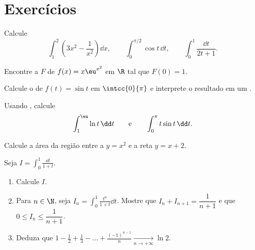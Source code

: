 \section{Exercícios}

\begin{exercise}[$\star$]\label{exo:g12:integ:1}
Calcule
\[
\int_1^2 \left(3x^2 - \frac{1}{x^2}\right)\dd x, \qquad
\int_0^{\pi/2} \cos t \,\dd t, \qquad
\int_0^{1} \frac{\dd t}{2t+1} .
\]
\end{exercise}

\begin{exercise}[$\star$]\label{exo:g12:integ:2}
Encontre a  $F$ de $f(x) = x\eu^{x^2}$ em $\R$ tal que
$F(0) = 1$.
\end{exercise}

\begin{exercise}[$\star$]\label{exo:g12:integ:3}
Calcule o  de $f(t) = \sin t$ em $\intcc{0}{\pi}$ e interprete o
resultado em um .
\end{exercise}

\begin{exercise}[$\star\star$]\label{exo:g12:integ:4}
Usando , calcule
\[
\int_1^{\eu} \ln t\,\dd t
\qquad\text{e}\qquad
\int_0^{\pi} t \sin t\,\dd t .
\]
\end{exercise}

\begin{exercise}[$\star\star$]\label{exo:g12:integ:5}
Calcule a área da região entre a  $y = x^2$ e a reta
$y = x + 2$.
\end{exercise}

\begin{exercise}[$\star\star$]\label{exo:g12:integ:6}
Seja $I = \displaystyle\int_0^1 \frac{\dd t}{1 + t}$.
\begin{enumerate}
  \item Calcule $I$.
  \item Para $n \in \N$, seja
        $I_n = \displaystyle\int_0^1 \frac{t^n}{1+t}\dd t$. Mostre que
        $I_n + I_{n+1} = \dfrac{1}{n+1}$ e que
        $0 \leq I_n \leq \dfrac{1}{n+1}$.
  \item Deduza que
        $1 - \frac12 + \frac13 - \dots + \frac{(-1)^{n-1}}{n}
        \xrightarrow[n \to +\infty]{} \ln 2$.
\end{enumerate}
\end{exercise}

